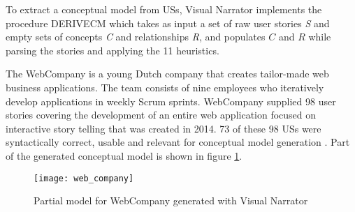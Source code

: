 To extract a conceptual model from USs, Visual Narrator implements the procedure DERIVECM which takes as input a set of raw user stories \emph{S} and empty sets of concepts \emph{C} and relationships \emph{R}, and populates $C$ and $R$ while parsing the stories and applying the 11 heuristics.

\begin{example}\label{ex_1}
The WebCompany is a young Dutch company that creates tailor-made web business applications. The team consists of nine employees who iteratively develop applications in weekly Scrum sprints. WebCompany supplied 98 user stories covering the development of an entire web application focused on interactive story telling that was created in 2014. 73 of these 98 USs were syntactically correct, usable and relevant for conceptual model generation \cite{lucassen2016improving}. Part of the generated conceptual model is shown in figure \ref{fig:webcompany}.
\begin{figure}
\center
\texttt{[image: web\_company]}
\caption{Partial model for WebCompany generated with Visual Narrator   \cite{Robeer2016}}\label{fig:webcompany}
\end{figure}
\end{example} 

